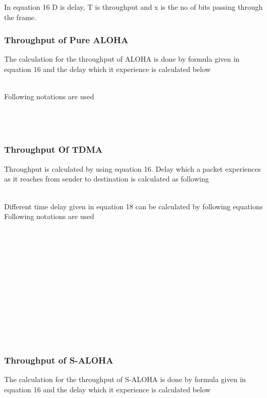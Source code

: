 \documentclass[11pt, conference, compsocconf, onecolumn]{IEEEtran}
\begin{document}
In equation 16 D is delay, T is throughput and x is the no of bits passing through the frame.
\subsubsection{Throughput of Pure ALOHA}
The calculation for the throughput of ALOHA is done by formula given in equation 16 and the delay which it experience is calculated below

\\
Following notations are used
\\\\
       
\\
  
\\

\subsubsection{Throughput Of TDMA}

Throughput is calculated by using equation 16. Delay which a packet experiences as it reaches from sender to destination is calculated as following


\\
Different time delay given in equation 18 can be calculated by following equations
\\


Following notations are used
\\\\
 
\\
       
\\
 
\\
 
\\
 
\\
 
\\
  
\\
  
\\
  
\\
  
\\
  
\\

\subsubsection{Throughput of S-ALOHA}
The calculation for the throughput of S-ALOHA is done by formula given in equation 16 and the delay which it experience is calculated below
\end{document}
